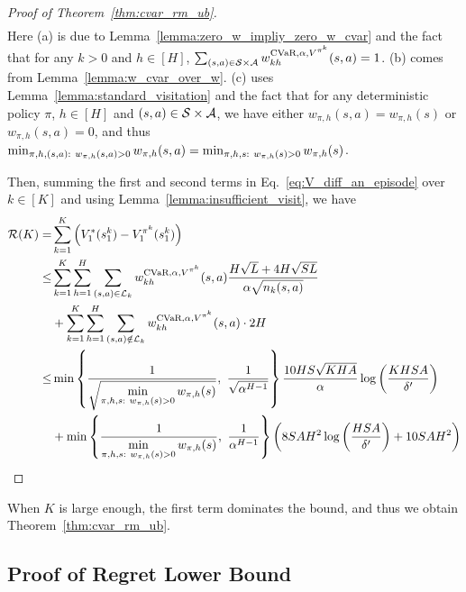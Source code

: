 \begin{proof}[Proof of Theorem~\ref{thm:cvar_rm_ub}]
\begin{align*}
	\end{align*}
	Here (a) is due to Lemma~\ref{lemma:zero_w_impliy_zero_w_cvar} and the fact that for any $k>0$ and $h \in [H]$, $\sum_{(s,a) \in \mathcal{S} \times \mathcal{A}} w^{\textup{CVaR},\alpha,V^{\pi^k}}_{kh}(s,a)=1$. (b) comes from Lemma~\ref{lemma:w_cvar_over_w}. (c) uses Lemma~\ref{lemma:standard_visitation} and the fact that for any deterministic policy $\pi$, $h \in [H]$ and $(s,a) \in \mathcal{S} \times \mathcal{A}$, we have either $w_{\pi,h}(s,a)=w_{\pi,h}(s)$ or $w_{\pi,h}(s,a)=0$, and thus $\min_{\begin{subarray}{c}\pi,h,(s,a):\ w_{\pi,h}(s,a)>0\end{subarray}} w_{\pi,h}(s,a)=\min_{\begin{subarray}{c}\pi,h,s:\  w_{\pi,h}(s)>0\end{subarray}} w_{\pi,h}(s)$.
	
	Then, summing the first and second terms in Eq.~\eqref{eq:V_diff_an_episode} over $k \in [K]$ and using Lemma~\ref{lemma:insufficient_visit}, we have
	\begin{align*}
		\mathcal{R}(K) = & \sum_{k=1}^{K} \left( V^{*}_1(s^k_1)-V^{\pi^k}_1(s^k_1) \right) 
		\\
		\leq & \sum_{k=1}^{K} \sum_{h=1}^{H} \sum_{(s,a) \in \mathcal{L}_k} w^{\textup{CVaR},\alpha,V^{\pi^k}}_{kh}(s,a) \frac{H\sqrt{L}+4H\sqrt{SL}}{\alpha  \sqrt{n_k(s,a)}} \\& + \sum_{k=1}^{K} \sum_{h=1}^{H} \sum_{(s,a) \notin \mathcal{L}_k} w^{\textup{CVaR},\alpha,V^{\pi^k}}_{kh}(s,a) \cdot 2H
		\\
		\leq & \min \left\{  \frac{1}{\sqrt{\min \limits_{\begin{subarray}{c}\pi,h,s:\  w_{\pi,h}(s)>0\end{subarray}} w_{\pi,h}(s)}},\ \frac{1}{\sqrt{\alpha^{H-1}}}  \right\} \frac{ 10HS \sqrt{KHA} }{\alpha} \log\left( \frac{KHSA}{\delta'} \right) \\& + \min \left\{ \frac{ 1 }{\min \limits_{\begin{subarray}{c}\pi,h,s:\  w_{\pi,h}(s)>0\end{subarray}} w_{\pi,h}(s)},\ \frac{1}{\alpha^{H-1}} \right\} \left(  8SAH^2 \log\left( \frac{HSA}{\delta'} \right) + 10SAH^2  \right)
	\end{align*}
\end{proof}

When $K$ is large enough, the first term dominates the bound, and thus we obtain Theorem~\ref{thm:cvar_rm_ub}.



\subsection{Proof of Regret Lower Bound} \label{apx:lb_rm}

